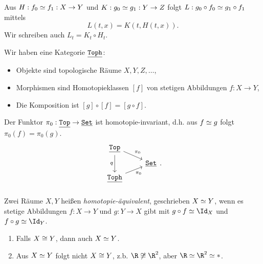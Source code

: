 \begin{st}
	Aus $H: f_0 \simeq f_1 : X \to Y$ und $K: g_0 \simeq g_1: Y \to Z$ folgt $L: g_0 \circ f_0 \simeq g_1 \circ f_1$ mittels
	\[
		L(t, x) = K(t, H(t,x)).
	\]
	Wir schreiben auch $L_t = K_t \circ H_t$.
\end{st}

\begin{kor}
	Wir haben eine Kategorie $\underline{\mathtt{Toph}}$:
	\begin{itemize}
		\item
			Objekte sind topologische Räume $X, Y, Z, \dotsc $,
		\item
			Morphismen sind Homotopieklassen $[f]$ von stetigen Abbildungen $f: X \to Y$,
		\item
			Die Komposition ist $[g] \circ [f] = [g\circ f]$.
	\end{itemize}
\end{kor}

\begin{st}
	Der Funktor $\pi_0: \underline{\mathtt{Top}} \to \underline{\mathtt{Set}}$ ist homotopie-invariant, d.h. aus $f \simeq g$ folgt $\pi_0(f) = \pi_0(g)$.
	\[
		\begin{tikzcd}[row sep=tiny]
			\Cat{Top} \arrow{dr}{\pi_0} \arrow{dd}[swap]{q} & \\
			& \Cat{Set} \\
			\Cat{Toph} \arrow{ur}[swap]{\pi_0} & \\
		\end{tikzcd}.
	\]
\end{st}

\begin{df}
	Zwei Räume $X, Y$ heißen \emph{homotopie-äquivalent}, geschrieben $X \simeq Y$, wenn es stetige Abbildungen $f: X \to Y$ und $g: Y \to X$ gibt mit $g \circ f \homotopic \Id_X$ und $f \circ g \homotopic \Id_Y$.
\end{df}

\begin{ex}
	\begin{enumerate}[1)]
		\item
			Falls $X \cong Y$, dann auch $X \simeq Y$.
		\item
			Aus $X \simeq Y$ folgt nicht $X \cong Y$, z.b. $\R \not \homeomorphic \R^2$, aber $\R \homotopic \R^2 \homotopic \ast$.
	\end{enumerate}
\end{ex}

